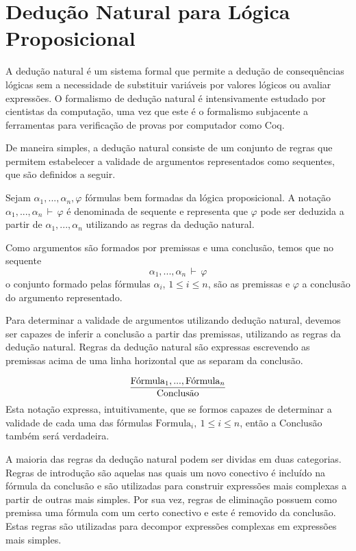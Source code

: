 \section{Dedu\c{c}\~ao Natural para L\'ogica Proposicional}\label{deducao-natural-proposicional}

A dedu\c{c}\~ao natural \'e um sistema formal que permite a
dedu\c{c}\~ao de consequ\^encias l\'ogicas sem a necessidade de
substituir vari\'aveis por valores l\'ogicos ou avaliar express\~oes.
O formalismo de dedu\c{c}\~ao natural \'e intensivamente estudado por
cientistas da computa\c{c}\~ao, uma vez que este \'e o formalismo
subjacente a ferramentas para verifica\c{c}\~ao de provas por
computador como Coq.

De maneira simples, a dedu\c{c}\~ao natural consiste de um conjunto de
regras que permitem estabelecer a validade de argumentos representados
como sequentes, que s\~ao definidos a seguir.

\begin{Definition}[Sequente]
Sejam $\alpha_1,...,\alpha_n,\varphi$ f\'ormulas bem formadas da
l\'ogica proposicional. A nota\c{c}\~ao
$\alpha_1,...,\alpha_n\,\vdash\,\varphi$ \'e denominada de sequente e
representa que $\varphi$ pode ser deduzida a partir de
$\alpha_1,...,\alpha_n$ utilizando as regras da dedu\c{c}\~ao natural.
\end{Definition}

Como argumentos s\~ao formados por premissas e uma conclus\~ao, temos
que no sequente
\[\alpha_1,...,\alpha_n\,\vdash\,\varphi\]
o conjunto formado pelas f\'ormulas $\alpha_i$, $1\leq i \leq n$,
s\~ao as premissas e
$\varphi$ a conclus\~ao do argumento representado.

Para determinar a validade de argumentos utilizando dedu\c{c}\~ao
natural, devemos ser capazes de inferir a conclus\~ao a partir das
premissas, utilizando as regras da dedu\c{c}\~ao natural. Regras da
dedu\c{c}\~ao natural s\~ao expressas escrevendo as premissas acima de
uma linha horizontal que as separam da conclus\~ao.

\[
      \infer
           {\text{Conclus\~ao}}
          {\text{F\'ormula}_1,...,\text{F\'ormula}_n}
\]
Esta nota\c{c}\~ao expressa, intuitivamente, que se formos capazes de
determinar a validade de cada uma das f\'ormulas $\text{Formula}_i,\:
1\leq i \leq n$, ent\~ao a Conclus\~ao tamb\'em ser\'a verdadeira.

A maioria das regras da dedu\c{c}\~ao natural podem ser dividas em duas categorias.
Regras de introdu\c{c}\~ao s\~ao aquelas nas quais um novo conectivo
\'e inclu\'ido na f\'ormula da conclus\~ao e s\~ao utilizadas para
construir express\~oes mais complexas a partir de outras mais simples.
Por sua vez, regras de elimina\c{c}\~ao possuem como premissa uma
f\'ormula com um certo conectivo e este \'e removido da
conclus\~ao. Estas regras s\~ao utilizadas para decompor express\~oes
complexas em express\~oes mais simples.

